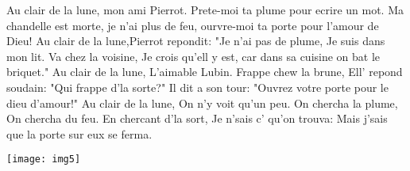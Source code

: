 \beginverse*
Au clair de la lune, mon ami Pierrot. Prete-moi ta plume pour ecrire un mot. Ma chandelle est morte, je n'ai plus de feu, ourvre-moi ta porte pour l'amour de Dieu!
\endverse
\beginverse*
Au clair de la lune,Pierrot repondit: "Je n'ai pas de plume, Je suis dans mon lit. Va chez la voisine, Je crois qu'ell y est, car dans sa cuisine on bat le briquet."
\endverse
\beginverse*
Au clair de la lune, L'aimable Lubin. Frappe chew la brune, Ell' repond soudain: "Qui frappe d'la sorte?" Il dit a son tour: "Ouvrez votre porte pour le dieu d'amour!"
\endverse
\beginverse*
Au clair de la lune, On n'y voit qu'un peu. On chercha la plume, On chercha du feu. En chercant d'la sort, Je n'sais c' qu'on trouva: Mais j'sais que la porte  sur eux se ferma.
\endverse
\endsong
\begin{intersong}
    \texttt{[image: img5]}
\end{intersong}